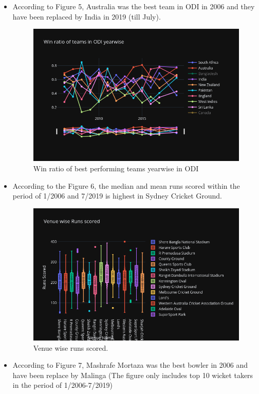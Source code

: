 \documentclass[fleqn,10pt]{wlscirep}
\begin{document}
\begin{itemize}
      \item According to Figure 5, Australia was the best team in ODI in 2006 and they have been replaced by India in 2019 (till July).
      \begin{figure}[h!]
        \centering
        \includegraphics[width=1\textwidth]{winteams.png}
        \caption{Win ratio of best performing teams yearwise in ODI}
      \end{figure}
      \item According to the Figure 6, the median and mean runs scored within the period of 1/2006 and 7/2019 is highest in Sydney Cricket Ground.
      \begin{figure}[h!]
        \centering
        \includegraphics[width=1\textwidth]{venueruns.png}
        \caption{Venue wise runs scored.}
      \end{figure}
      \item According to Figure 7, Mashrafe Mortaza was the best bowler in 2006 and have been replace by Malinga (The figure only includes top 10 wicket takers in the period of 1/2006-7/2019)

\end{itemize}
\end{document}
